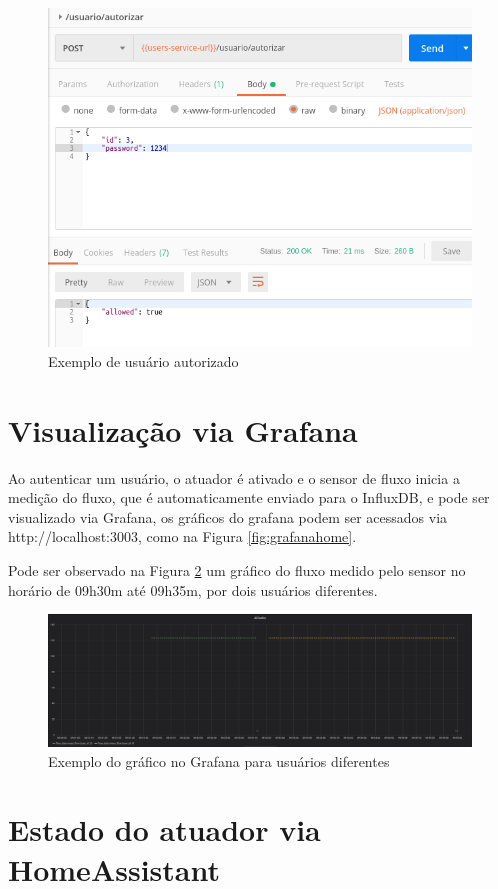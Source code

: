 \begin{figure}[htbp]
	\centering
	\includegraphics[width=0.7\linewidth]{figuras/postman/allowedtrue.png}
	\caption{Exemplo de usuário autorizado}
	\label{fig:allowedtrue}
\end{figure}

\section{Visualização via Grafana}

Ao autenticar um usuário, o atuador é ativado e o sensor de fluxo inicia a medição do fluxo, que é automaticamente enviado para o InfluxDB, e pode ser visualizado via Grafana, os gráficos do grafana podem ser acessados via http://localhost:3003, como na Figura \ref{fig:grafanahome}.

Pode ser observado na Figura \ref{fig:grafana-graph} um gráfico do fluxo medido pelo sensor no horário de 09h30m até 09h35m, por dois usuários diferentes.

\begin{figure}[htbp]
	\centering
	\includegraphics[width=1\linewidth]{figuras/grafanagraph.png}
	\caption{Exemplo do gráfico no Grafana para usuários diferentes}
	\label{fig:grafana-graph}
\end{figure}

\section{Estado do atuador via HomeAssistant}

